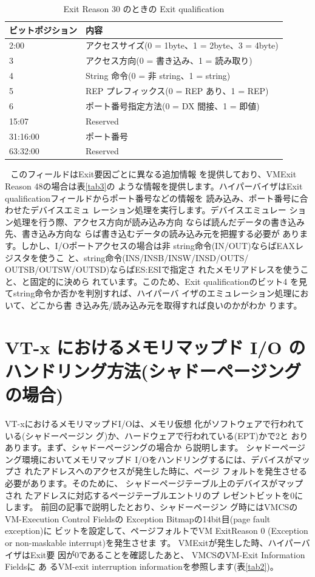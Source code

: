 \begin{table}
\begin{tabular}{|l|l|} \hline

ビットポジション & 内容 \\
\hline
2:00 & アクセスサイズ(0 = 1byte、1 = 2byte、3 = 4byte) 	\\
\hline
3 & アクセス方向(0 = 書き込み、1 = 読み取り) 	\\
\hline
4 & String 命令(0 = 非 string、1 = string) 	\\
\hline
5 & REP プレフィックス(0 = REP あり、1 = REP) \\
\hline
6 & ポート番号指定方法(0 = DX 間接、1 = 即値) \\
\hline
15:07 & Reserved 	\\
\hline
31:16:00 & ポート番号 \\
\hline
63:32:00 & Reserved \\
\hline


\end{tabular}
\caption{Exit Reason 30 のときの Exit qualification}
\label{tab1}
\end{table}

 
 このフィールドはExit要因ごとに異なる追加情報
を提供しており、VMExit Reason 48の場合は表\ref{tab3}の
ような情報を提供します。ハイパーバイザはExit
qualificationフィールドからポート番号などの情報を
読み込み、ポート番号に合わせたデバイスエミュ
レーション処理を実行します。デバイスエミュレー
ション処理を行う際、アクセス方向が読み込み方向
ならば読んだデータの書き込み先、書き込み方向な
らば書き込むデータの読み込み元を把握する必要が
あります。しかし、I/Oポートアクセスの場合は非
string命令(IN/OUT)ならばEAXレジスタを使うこ
と、string命令(INS/INSB/INSW/INSD/OUTS/
OUTSB/OUTSW/OUTSD)ならばES:ESIで指定さ
れたメモリアドレスを使うこと、と固定的に決めら
れています。このため、Exit qualificationのビット4
を見てstring命令か否かを判別すれば、ハイパーバ
イザのエミュレーション処理において、どこから書
き込み先/読み込み元を取得すれば良いのかがわか
ります。


\section{VT-x におけるメモリマップド I/O のハンドリング方法(シャドーページングの場合)}

 VT-xにおけるメモリマップドI/Oは、メモリ仮想
化がソフトウェアで行われている(シャドーページン
グ)か、ハードウェアで行われている(EPT)かで2と
おりあります。まず、シャドーページングの場合か
ら説明します。
 シャドーページング環境においてメモリマップド
I/Oをハンドリングするには、デバイスがマップさ
れたアドレスへのアクセスが発生した時に、ページ
フォルトを発生させる必要があります。そのために、
シャドーページテーブル上のデバイスがマップされ
たアドレスに対応するページテーブルエントリのプ
レゼントビットを0にします。
 前回の記事で説明したとおり、シャドーページン
グ時にはVMCSのVM-Execution Control Fieldsの
Exception Bitmapの14bit目(page fault exception)に
ビットを設定して、ページフォルトでVM ExitReason
0 (Exception or non-maskable interrupt)を発生させま
す。 VMExitが発生した時、ハイパーバイザはExit要
因が0であることを確認したあと、 VMCSのVM-Exit
Information Fieldsに あ るVM-exit interruption
informationを参照します(表\ref{tab2})。

